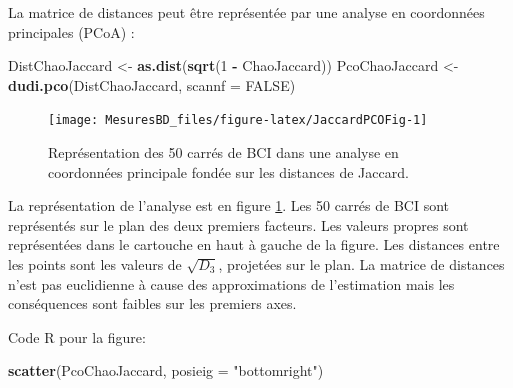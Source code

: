 \documentclass[
  11pt,
  french,
  a4paper,
  extrafontsizes,onecolumn,openright
  ]{memoir}
\newenvironment{Shaded}{\begin{snugshade}}{\end{snugshade}}
\newcommand{\AttributeTok}[1]{\textcolor[rgb]{0.13,0.29,0.53}{#1}}
\newcommand{\ConstantTok}[1]{\textcolor[rgb]{0.56,0.35,0.01}{#1}}
\newcommand{\DecValTok}[1]{\textcolor[rgb]{0.00,0.00,0.81}{#1}}
\newcommand{\FunctionTok}[1]{\textcolor[rgb]{0.13,0.29,0.53}{\textbf{#1}}}
\newcommand{\NormalTok}[1]{#1}
\newcommand{\OtherTok}[1]{\textcolor[rgb]{0.56,0.35,0.01}{#1}}
\newcommand{\SpecialCharTok}[1]{\textcolor[rgb]{0.81,0.36,0.00}{\textbf{#1}}}
\newcommand{\StringTok}[1]{\textcolor[rgb]{0.31,0.60,0.02}{#1}}
\begin{document}
La matrice de distances peut être représentée par une analyse en coordonnées principales (PCoA) \autocite{Gower1966}:

\scriptsize

\begin{Shaded}
\begin{Highlighting}[]
\NormalTok{DistChaoJaccard }\OtherTok{\textless{}{-}} \FunctionTok{as.dist}\NormalTok{(}\FunctionTok{sqrt}\NormalTok{(}\DecValTok{1} \SpecialCharTok{{-}}\NormalTok{ ChaoJaccard))}
\NormalTok{PcoChaoJaccard }\OtherTok{\textless{}{-}} \FunctionTok{dudi.pco}\NormalTok{(DistChaoJaccard, }\AttributeTok{scannf =} \ConstantTok{FALSE}\NormalTok{)}
\end{Highlighting}
\end{Shaded}

\normalsize



\scriptsize

\begin{figure}

{\centering \texttt{[image: MesuresBD\_files/figure-latex/JaccardPCOFig-1]} 

}

\caption{Représentation des 50 carrés de BCI dans une analyse en coordonnées principale fondée sur les distances de Jaccard.}\label{fig:JaccardPCOFig}
\end{figure}

\normalsize

La représentation de l'analyse est en figure \ref{fig:JaccardPCOFig}.
Les 50 carrés de BCI sont représentés sur le plan des deux premiers facteurs.
Les valeurs propres sont représentées dans le cartouche en haut à gauche de la figure.
Les distances entre les points sont les valeurs de \(\sqrt{D_3}\), projetées sur le plan.
La matrice de distances n'est pas euclidienne à cause des approximations de l'estimation mais les conséquences sont faibles sur les premiers axes.

Code R pour la figure:

\scriptsize

\begin{Shaded}
\begin{Highlighting}[]
\FunctionTok{scatter}\NormalTok{(PcoChaoJaccard, }\AttributeTok{posieig =} \StringTok{"bottomright"}\NormalTok{)}
\end{Highlighting}
\end{Shaded}

\normalsize
\end{document}
